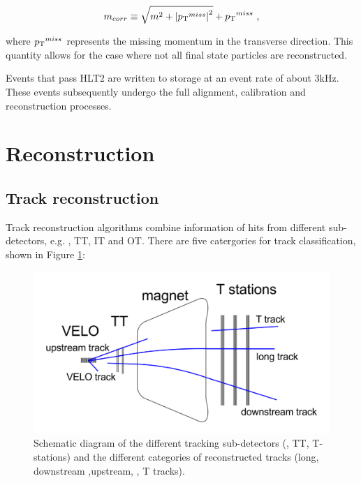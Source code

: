 \begin{equation}
m_{corr} \equiv \sqrt{m^2 + {| \mbox{$p_{\mathrm{ T}}$}^{miss} |}^2} + \mbox{$p_{\mathrm{ T}}$}^{miss} \text{ ,}
\end{equation}

where $\mbox{$p_{\mathrm{ T}}$}^{miss}$ represents the missing momentum in the transverse direction. This quantity allows for the case where not all final state particles are reconstructed. 

Events that pass HLT2 are written to storage at an event rate of about 3kHz. These events subsequently undergo the full alignment, calibration and reconstruction processes.

\section{Reconstruction}

\subsection{Track reconstruction}
\label{sec:detector:tracks}

Track reconstruction algorithms combine information of hits from different sub-detectors, e.g. \velo, TT, IT and OT. There are five catergories for track classification, shown in Figure \ref{tracktypes}:

\begin{figure}[h]
\includegraphics[width=\linewidth]{figures/detector/tracktypes.pdf}
\caption{Schematic diagram of the different tracking sub-detectors (\velo, TT, T-stations) and the different categories of reconstructed tracks (long, downstream ,upstream, \velo, T tracks).}
\label{tracktypes}
\end{figure}

